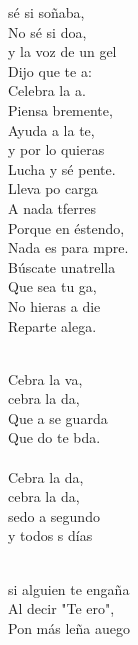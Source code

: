 \begin{cancion}%
	 sé si soñaba,\\
	No sé si doa, \\
	y la voz de un gel\\
	Dijo que te a:\\
	Celebra la a.   \\
	Piensa bremente,\\
	Ayuda a la te,\\
	y por lo  quieras\\
	Lucha y sé pente.\\
	Lleva po carga\\
	A nada tferres\\
	Porque en éstendo,\\
	Nada es para mpre.\\
	Búscate unatrella\\
	Que sea tu ga, \\
	No hieras a die\\
	Reparte alega.\\\jump\\
	\begin{chorus}%
	Cebra la va, \\
	cebra la da,\\
	Que a se guarda\\
	Que do te bda.\\
\jump\\
	Cebra la da, \\
	cebra la da,\\
	sedo a segundo\\
	y todos s días\\
	\end{chorus}%
	\jump\\
	si alguien te engaña\\
	Al decir "Te ero",\\
	Pon más leña auego\\

\end{cancion}
